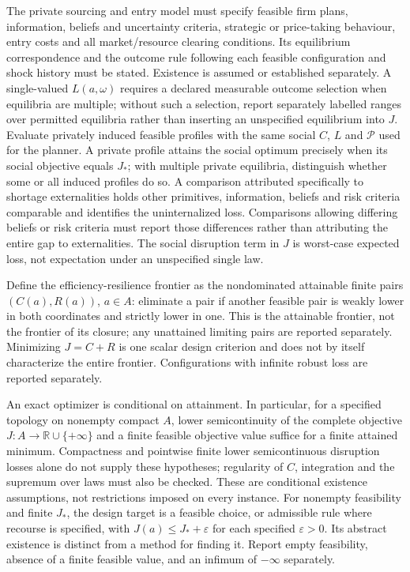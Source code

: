 \documentclass[11pt,a4paper]{article}
\begin{document}
The private sourcing and entry model must specify feasible firm plans, information, beliefs and uncertainty criteria, strategic or price-taking behaviour, entry costs and all market/resource clearing conditions. Its equilibrium correspondence and the outcome rule following each feasible configuration and shock history must be stated. Existence is assumed or established separately. A single-valued \(L(a,\omega)\) requires a declared measurable outcome selection when equilibria are multiple; without such a selection, report separately labelled ranges over permitted equilibria rather than inserting an unspecified equilibrium into \(J\). Evaluate privately induced feasible profiles with the same social \(C\), \(L\) and \(\mathcal P\) used for the planner. A private profile attains the social optimum precisely when its social objective equals \(J_*\); with multiple private equilibria, distinguish whether some or all induced profiles do so. A comparison attributed specifically to shortage externalities holds other primitives, information, beliefs and risk criteria comparable and identifies the uninternalized loss. Comparisons allowing differing beliefs or risk criteria must report those differences rather than attributing the entire gap to externalities. The social disruption term in \(J\) is worst-case expected loss, not expectation under an unspecified single law.

Define the efficiency-resilience frontier as the nondominated attainable finite pairs \((C(a),R(a))\), \(a\in A\): eliminate a pair if another feasible pair is weakly lower in both coordinates and strictly lower in one. This is the attainable frontier, not the frontier of its closure; any unattained limiting pairs are reported separately. Minimizing \(J=C+R\) is one scalar design criterion and does not by itself characterize the entire frontier. Configurations with infinite robust loss are reported separately.

An exact optimizer is conditional on attainment. In particular, for a specified topology on nonempty compact \(A\), lower semicontinuity of the complete objective \(J:A\to\mathbb R\cup\{+\infty\}\) and a finite feasible objective value suffice for a finite attained minimum. Compactness and pointwise finite lower semicontinuous disruption losses alone do not supply these hypotheses; regularity of \(C\), integration and the supremum over laws must also be checked. These are conditional existence assumptions, not restrictions imposed on every instance. For nonempty feasibility and finite \(J_*\), the design target is a feasible choice, or admissible rule where recourse is specified, with \(J(a)\leq J_*+\varepsilon\) for each specified \(\varepsilon>0\). Its abstract existence is distinct from a method for finding it. Report empty feasibility, absence of a finite feasible value, and an infimum of \(-\infty\) separately.
\end{document}
